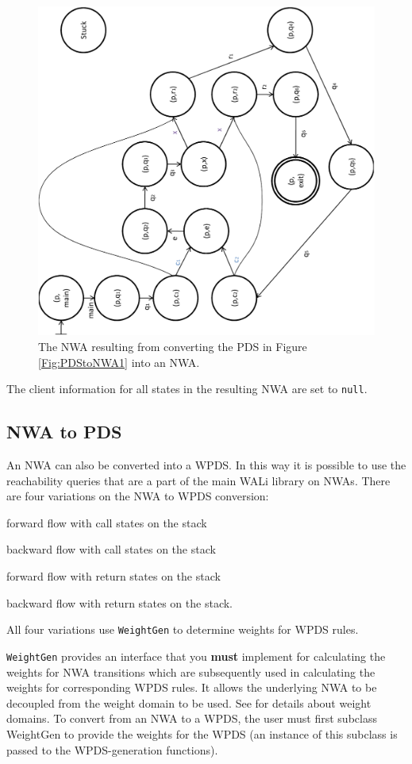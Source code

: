 \documentclass{llncs}
\begin{document}
\begin{figure}[p]
  \centering
    \includegraphics[width=12cm]{Figures/Figure22}
  \caption{The NWA resulting from converting the PDS in Figure \ref{Fig:PDStoNWA1} into an NWA.}
  \label{Fig:PDStoNWA2}
\end{figure}

The client information for all states in the resulting NWA are set to \texttt{null}.

\subsection{NWA to PDS}
\label{Se:NWAtoPDS}

An NWA can also be converted into a WPDS.  In this way it is possible to use the reachability queries that are a part of the main WALi library on NWAs.  There are four variations on the NWA to WPDS conversion: \begin{inparaenum} \item forward flow with call states on the stack \item backward flow with call states on the stack \item forward flow with return states on the stack \item backward flow with return states on the stack. \end{inparaenum}  All four variations use \texttt{WeightGen} to determine weights for WPDS rules.

\texttt{WeightGen} provides an interface that you \textbf{must} implement for calculating the weights for NWA transitions which are subsequently used in calculating the weights for corresponding WPDS rules.  It allows the underlying NWA to be decoupled from the weight domain to be used.  See \cite[\S4-\S5]{wali} for details about weight domains. To convert from an NWA to a WPDS, the user must first subclass WeightGen to provide the weights for the WPDS (an instance of this subclass is passed to the WPDS-generation functions). \\ 
\end{document}
